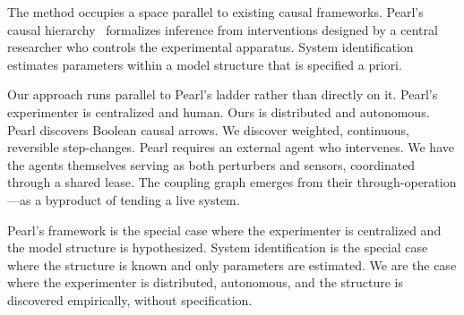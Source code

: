 The method occupies a space parallel to existing causal frameworks.
Pearl's causal hierarchy~\citep{pearl2009causality} formalizes
inference from interventions designed by a central researcher who
controls the experimental apparatus. System
identification~\citep{ljung1999sid} estimates parameters within a
model structure that is specified a priori.

Our approach runs parallel to Pearl's ladder rather than directly
on it. Pearl's experimenter is centralized and human. Ours is
distributed and autonomous. Pearl discovers Boolean causal arrows.
We discover weighted, continuous, reversible step-changes. Pearl
requires an external agent who intervenes. We have the agents
themselves serving as both perturbers and sensors, coordinated
through a shared lease. The coupling graph emerges from their
through-operation---as a byproduct of tending a live system.

Pearl's framework is the special case where the experimenter is
centralized and the model structure is hypothesized. System
identification is the special case where the structure is known
and only parameters are estimated. We are the case where the
experimenter is distributed, autonomous, and the structure is
discovered empirically, without specification.

